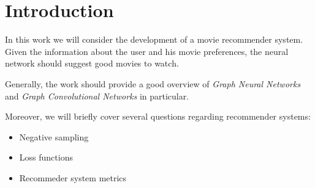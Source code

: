 \section{Introduction}

In this work we will consider the development of a movie recommender system.
Given the information about the user and his movie preferences, the neural
network should suggest good movies to watch.

Generally, the work should provide a good overview of \textit{Graph Neural
    Networks} and \textit{Graph Convolutional Networks} in particular.

Moreover, we will briefly cover several questions regarding recommender
systems:

\begin{itemize}
    \item Negative sampling
    \item Loss functions
    \item Recommeder system metrics
\end{itemize}